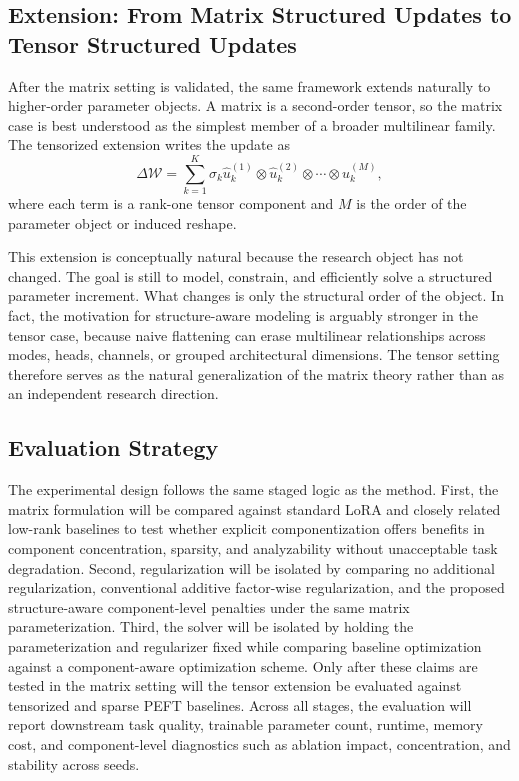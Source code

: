 \documentclass[11pt]{article}
\begin{document}
\subsection{Extension: From Matrix Structured Updates to Tensor Structured Updates}

After the matrix setting is validated, the same framework extends naturally to higher-order parameter objects. A matrix is a second-order tensor, so the matrix case is best understood as the simplest member of a broader multilinear family. The tensorized extension writes the update as
\[
\Delta \mathcal{W} = \sum_{k=1}^{K} \sigma_k \hat{u}^{(1)}_k \otimes \hat{u}^{(2)}_k \otimes \cdots \otimes \hat{u}^{(M)}_k,
\]
where each term is a rank-one tensor component and $M$ is the order of the parameter object or induced reshape.

This extension is conceptually natural because the research object has not changed. The goal is still to model, constrain, and efficiently solve a structured parameter increment. What changes is only the structural order of the object. In fact, the motivation for structure-aware modeling is arguably stronger in the tensor case, because naive flattening can erase multilinear relationships across modes, heads, channels, or grouped architectural dimensions. The tensor setting therefore serves as the natural generalization of the matrix theory rather than as an independent research direction.

\subsection{Evaluation Strategy}

The experimental design follows the same staged logic as the method. First, the matrix formulation will be compared against standard LoRA and closely related low-rank baselines to test whether explicit componentization offers benefits in component concentration, sparsity, and analyzability without unacceptable task degradation. Second, regularization will be isolated by comparing no additional regularization, conventional additive factor-wise regularization, and the proposed structure-aware component-level penalties under the same matrix parameterization. Third, the solver will be isolated by holding the parameterization and regularizer fixed while comparing baseline optimization against a component-aware optimization scheme. Only after these claims are tested in the matrix setting will the tensor extension be evaluated against tensorized and sparse PEFT baselines. Across all stages, the evaluation will report downstream task quality, trainable parameter count, runtime, memory cost, and component-level diagnostics such as ablation impact, concentration, and stability across seeds.
\end{document}
